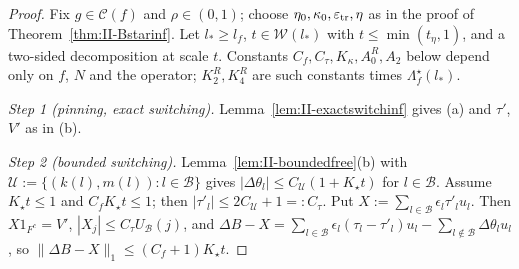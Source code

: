 \documentclass[10pt]{amsart}
\theoremstyle{definition}
\theoremstyle{remark}
\newcommand{\Cset}{\mathcal C}
\begin{document}
\begin{proof}
Fix $g\in\Cset(f)$ and $\rho\in(0,1)$; choose $\eta_0,\kappa_0,
\varepsilon_{\rm tr},\eta$ as in the proof of Theorem~\ref{thm:II-Bstarinf}.
Let $l_*\ge l_f$, $t\in\mathcal W(l_*)$ with $t\le\min(t_\eta,1)$, and a
two-sided decomposition at scale $t$.  Constants $C_f,C_\tau,K_\kappa,
A^R_0,A_2$ below depend only on $f$, $N$ and the operator; $K^R_2,K^R_4$ are
such constants times $\Lambda^\star_f(l_*)$.

\emph{Step 1 (pinning, exact switching).}  Lemma~\ref{lem:II-exactswitchinf}
gives (a) and $\tau'$, $V'$ as in (b).

\emph{Step 2 (bounded switching).}  Lemma~\ref{lem:II-boundedfree}(b) with
$\mathcal U:=\{(k(l),m(l)):l\in\mathcal B\}$ gives $|\Delta\theta_l|\le
C_{\mathcal U}(1+K_\star t)$ for $l\in\mathcal B$.  Assume $K_\star t\le1$ and
$C_fK_\star t\le1$; then $|\tau'_l|\le2C_{\mathcal U}+1=:C_\tau$.  Put
$X:=\sum_{l\in\mathcal B}\epsilon_l\tau'_lu_l$.  Then $X1_{F^c}=V'$,
$|X_j|\le C_\tau U_{\mathcal B}(j)$, and $\Delta B-X=\sum_{l\in\mathcal B}
\epsilon_l(\tau_l-\tau'_l)u_l-\sum_{l\notin\mathcal B}\Delta\theta_lu_l$, so
$\|\Delta B-X\|_1\le(C_f+1)K_\star t$.


\end{proof}
\end{document}
